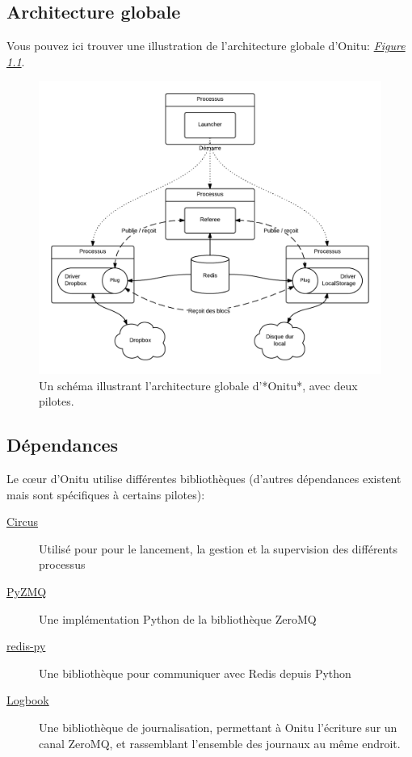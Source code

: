 \documentclass[letterpaper,10pt,english]{sphinxmanual}
\begin{document}
\subsection{Architecture globale}
\label{intro:global-architecture}
Vous pouvez ici trouver une illustration de l'architecture globale d'Onitu: {\hyperref[intro:schematic]{\emph{Figure 1.1}}}.
\begin{figure}[htbp]
\centering
\capstart

\includegraphics{global_archi.png}
\caption{Un schéma illustrant l'architecture globale d'*Onitu*, avec deux pilotes.}\label{intro:schematic}\end{figure}


\subsection{Dépendances}
\label{intro:dependencies}
Le cœur d'Onitu utilise différentes bibliothèques (d'autres dépendances existent mais sont spécifiques à certains pilotes):
\begin{description}
\item[{\href{http://circus.readthedocs.org}{Circus}}] \leavevmode
Utilisé pour pour le lancement, la gestion et la supervision des différents processus

\item[{\href{http://github.com/zeromq/pyzmq}{PyZMQ}}] \leavevmode
Une implémentation Python de la bibliothèque ZeroMQ

\item[{\href{http://github.com/andymccurdy/redis-py}{redis-py}}] \leavevmode
Une bibliothèque pour communiquer avec Redis depuis Python

\item[{\href{http://pythonhosted.org/Logbook/}{Logbook}}] \leavevmode
Une bibliothèque de journalisation, permettant à Onitu l'écriture sur un canal ZeroMQ, et rassemblant l'ensemble des journaux au même endroit.

\end{description}
\end{document}
